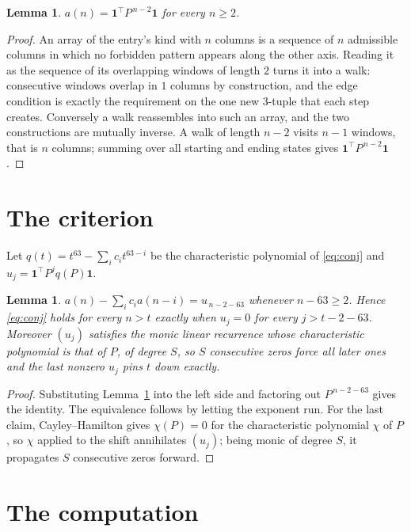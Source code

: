 \documentclass[11pt,a4paper]{article}
\theoremstyle{plain}
\newtheorem{lemma}[theorem]{Lemma}
\theoremstyle{definition}
\begin{document}
\begin{lemma}\label{lem:walk}
$a(n)=\mathbf{1}^{\!\top}P^{\,n-2}\mathbf{1}$ for every $n\ge2$.
\end{lemma}

\begin{proof}
An array of the entry's kind with $n$ columns is a sequence of $n$ admissible columns in
which no forbidden pattern appears along the other axis. Reading it as the sequence of its
overlapping windows of length $2$ turns it into a walk: consecutive windows overlap in
$1$ columns by construction, and the edge condition is exactly the requirement on the one
new $3$-tuple that each step creates. Conversely a walk reassembles into such an array,
and the two constructions are mutually inverse. A walk of length $n-2$ visits $n-1$
windows, that is $n$ columns; summing over all starting and ending states gives
$\mathbf{1}^{\!\top}P^{\,n-2}\mathbf{1}$.
\end{proof}

\section{The criterion}

Let $q(t)=t^{63}-\sum_i c_i t^{63-i}$ be the characteristic polynomial of
\eqref{eq:conj} and $u_j=\mathbf{1}^{\!\top}P^{j}q(P)\mathbf{1}$.

\begin{lemma}\label{lem:crit}
$a(n)-\sum_i c_i a(n-i)=u_{\,n-2-63}$ whenever $n-63\ge2$. Hence
\eqref{eq:conj} holds for every $n>t$ exactly when $u_j=0$ for every
$j>t-2-63$. Moreover $(u_j)$ satisfies the monic linear recurrence whose
characteristic polynomial is that of $P$, of degree $S$, so $S$ consecutive zeros force all
later ones and the last nonzero $u_j$ pins $t$ down exactly.
\end{lemma}

\begin{proof}
Substituting Lemma~\ref{lem:walk} into the left side and factoring out
$P^{\,n-2-63}$ gives the identity. The equivalence follows by letting the exponent
run. For the last claim, Cayley--Hamilton gives $\chi(P)=0$ for the characteristic
polynomial $\chi$ of $P$, so $\chi$ applied to the shift annihilates $(u_j)$; being monic of
degree $S$, it propagates $S$ consecutive zeros forward.
\end{proof}

\section{The computation}
\end{document}
